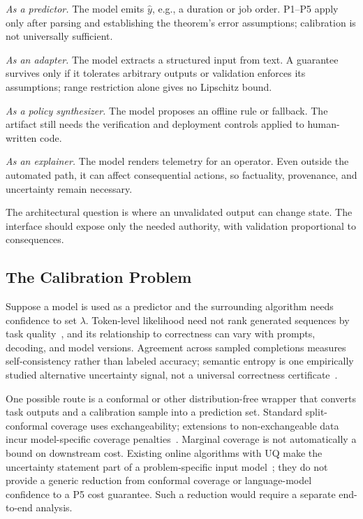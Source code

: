 \documentclass[acmsmall,screen,nonacm]{acmart}
\theoremstyle{acmdefinition}%
\begin{document}
\emph{As a predictor.} The model emits $\hat y$, e.g., a duration or job order. P1--P5 apply only after parsing and establishing the theorem's error assumptions; calibration is not universally sufficient.

\emph{As an adapter.} The model extracts a structured input from text. A guarantee survives only if it tolerates arbitrary outputs or validation enforces its assumptions; range restriction alone gives no Lipschitz bound.

\emph{As a policy synthesizer.} The model proposes an offline rule or fallback. The artifact still needs the verification and deployment controls applied to human-written code.

\emph{As an explainer.} The model renders telemetry for an operator. Even outside the automated path, it can affect consequential actions, so factuality, provenance, and uncertainty remain necessary.


The architectural question is where an unvalidated output can change state. The interface should expose only the needed authority, with validation proportional to consequences.

\subsection{The Calibration Problem}
\label{subsec:llm_calib}

Suppose a model is used as a predictor and the surrounding algorithm needs confidence to set $\lambda$. Token-level likelihood need not rank generated sequences by task quality~\cite{zhao2023slic}, and its relationship to correctness can vary with prompts, decoding, and model versions. Agreement across sampled completions measures self-consistency rather than labeled accuracy; semantic entropy is one empirically studied alternative uncertainty signal, not a universal correctness certificate~\cite{farquhar2024semantic}.

One possible route is a conformal or other distribution-free wrapper that converts task outputs and a calibration sample into a prediction set. Standard split-conformal coverage uses exchangeability; extensions to non-exchangeable data incur model-specific coverage penalties~\cite{oliveira2024split}. Marginal coverage is not automatically a bound on downstream cost. Existing online algorithms with UQ make the uncertainty statement part of a problem-specific input model~\cite{sun2024uncertainty}; they do not provide a generic reduction from conformal coverage or language-model confidence to a P5 cost guarantee. Such a reduction would require a separate end-to-end analysis.
\end{document}
